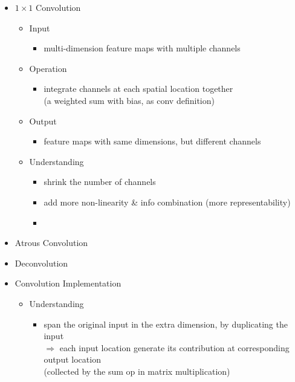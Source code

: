 \begin{itemize}
\item $1\times1$ Convolution
	\begin{itemize}
	\item Input
		\begin{itemize}
		\item multi-dimension feature maps with multiple channels
		\end{itemize}
	\item Operation
		\begin{itemize}
		\item integrate channels at each spatial location together \\
		(a weighted sum with bias, as conv definition)
		\end{itemize}
	\item Output
		\begin{itemize}
		\item feature maps with same dimensions, but different channels
		\end{itemize}
	\item Understanding
		\begin{itemize}
		\item shrink the number of channels
		\item add more non-linearity \& info combination (more representability)
		\item 
		\end{itemize}
	\end{itemize}

\item Atrous Convolution
\item Deconvolution

\item Convolution Implementation
	\begin{itemize}
	\item Understanding
		\begin{itemize}
		\item span the original input in the extra dimension, by duplicating the input \\
		$\Rightarrow$ each input location generate its contribution at corresponding output location \\
		(collected by the sum op in matrix multiplication)
		\end{itemize}
	\end{itemize}
\end{itemize}

